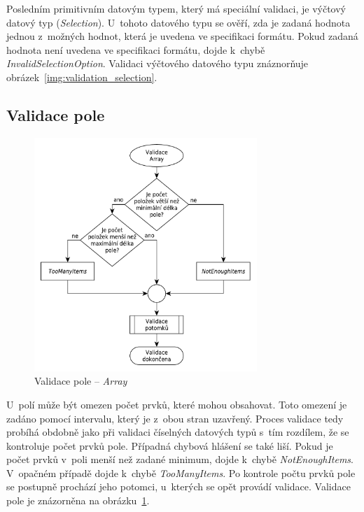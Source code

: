 \documentclass[FM,bw,DP]{tulthesis}
\begin{document}
Posledním primitivním datovým typem, který má speciální validaci, je výčtový datový typ (\textit{Selection}). U~tohoto datového typu se ověří, zda je zadaná hodnota jednou z~možných hodnot, která je uvedena ve specifikaci formátu. Pokud zadaná hodnota není uvedena ve specifikaci formátu, dojde k~chybě \textit{InvalidSelectionOption}. Validaci výčtového datového typu znáznorňuje obrázek~\ref{img:validation_selection}.

\clearpage
\subsection{Validace pole}

\begin{figure}[h]
	\centering
    \includegraphics[width=0.75\textwidth]{../img/validation_array.pdf}
    \caption{Validace pole -- \textit{Array}}
	\label{img:validation_array}
\end{figure}

U~polí může být omezen počet prvků, které mohou obsahovat. Toto omezení je zadáno pomocí intervalu, který je z~obou stran uzavřený. Proces validace tedy probíhá obdobně jako při validaci číselných datových typů s~tím rozdílem, že se kontroluje počet prvků pole. Případná chybová hlášení se také liší. Pokud je počet prvků v~poli menší než zadané minimum, dojde k~chybě \textit{NotEnoughItems}. V~opačném případě dojde k~chybě \textit{TooManyItems}. Po kontrole počtu prvků pole se postupně prochází jeho potomci, u~kterých se opět provádí validace. Validace pole je znázorněna na obrázku~\ref{img:validation_array}.
\end{document}
